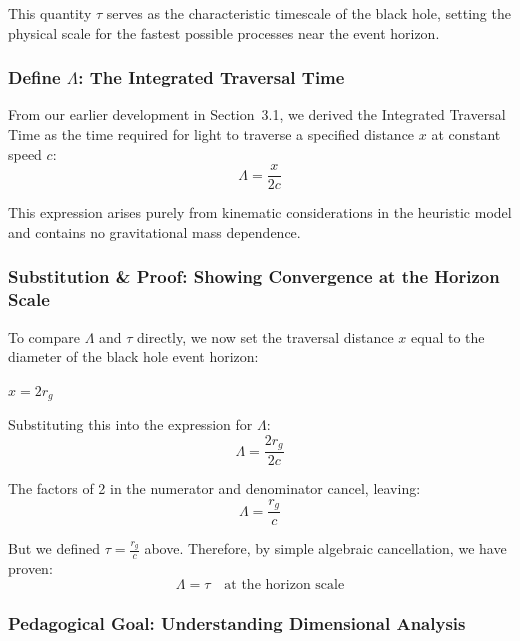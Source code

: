 \documentclass[12pt,a4paper]{article}
\begin{document}
This quantity $\tau$ serves as the characteristic timescale of the black hole, setting the physical scale for the fastest possible processes near the event horizon.

\subsubsection{Define \texorpdfstring{$\Lambda$}{Lambda}: The Integrated Traversal Time}

From our earlier development in Section~3.1, we derived the Integrated Traversal Time as the time required for light to traverse a specified distance $x$ at constant speed $c$:
\begin{equation}
    \Lambda = \frac{x}{2c}
\end{equation}

This expression arises purely from kinematic considerations in the heuristic model and contains no gravitational mass dependence.

\subsubsection{Substitution \& Proof: Showing Convergence at the Horizon Scale}

To compare $\Lambda$ and $\tau$ directly, we now set the traversal distance $x$ equal to the diameter of the black hole event horizon:
\begin{center}
    $x = 2r_g$
\end{center}

Substituting this into the expression for $\Lambda$:
\begin{equation}
    \Lambda = \frac{2r_g}{2c}
\end{equation}

The factors of 2 in the numerator and denominator cancel, leaving:
\begin{equation}
    \Lambda = \frac{r_g}{c}
\end{equation}

But we defined $\tau = \frac{r_g}{c}$ above. Therefore, by simple algebraic cancellation, we have proven:
\begin{equation}
    \Lambda = \tau \quad \text{at the horizon scale}
\end{equation}

\subsubsection{Pedagogical Goal: Understanding Dimensional Analysis}
\end{document}
